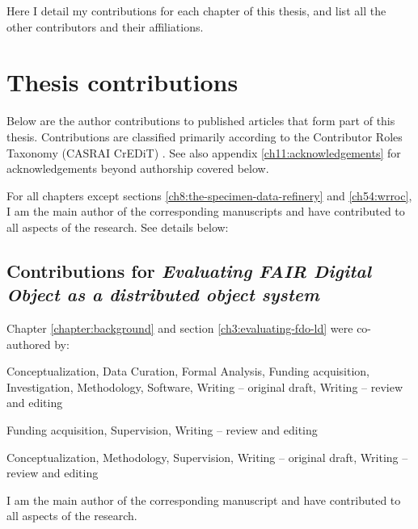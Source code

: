 \label{ch10:contributions} 

Here I detail my contributions for each chapter of this thesis, and
list all the other contributors and their affiliations.



\section{Thesis contributions}\label{ch10:my-contributions}

Below are the author contributions to published articles that form part
of this thesis. Contributions are classified primarily according to the
Contributor Roles Taxonomy (CASRAI CrEDiT) \cite{Brand 2015}. See 
also appendix \vref{ch11:acknowledgements} for acknowledgements beyond authorship covered below.

For all chapters except sections \ref{ch8:the-specimen-data-refinery} and \ref{ch54:wrroc}, I am the main author of the corresponding manuscripts and have contributed to all aspects of the research. See details below:



\subsection{Contributions for \emph{Evaluating FAIR Digital
Object as a distributed object system}}\label{ch10:fdo}

Chapter \vref{chapter:background} and section \vref{ch3:evaluating-fdo-ld} were co-authored by:

\begin{flushleft}\begin{description}
\tightlist
\item[Stian Soiland-Reyes]
Conceptualization, Data Curation, Formal Analysis, Funding acquisition, Investigation,
Methodology, Software, Writing -- original draft, Writing -- review and
editing
\item[Carole Goble]
Funding acquisition, Supervision, Writing -- review and editing
\item[Paul Groth]
Conceptualization, Methodology, Supervision, Writing -- original draft, Writing -- review
and editing
\end{description}\end{flushleft}

I am the main author of the corresponding manuscript and have contributed to all aspects of the research. 


